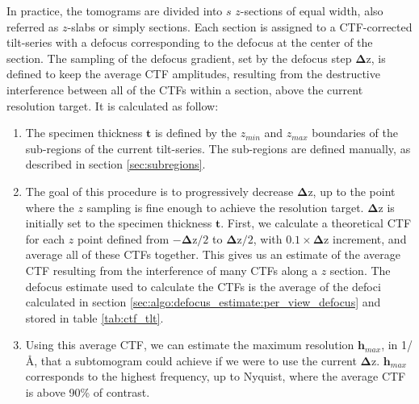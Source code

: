 In practice, the tomograms are divided into $s$ $z$-sections of equal width, also referred as $z$-slabs or simply sections. Each section is assigned to a CTF-corrected tilt-series with a defocus corresponding to the defocus at the center of the section. The sampling of the defocus gradient, set by the defocus step $\bm{\Delta \mathrm{z}}$, is defined to keep the average CTF amplitudes, resulting from the destructive interference between all of the CTFs within a section, above the current resolution target. It is calculated as follow:
\begin{enumerate}
    \item The specimen thickness $\bm{t}$ is defined by the $z_{min}$ and $z_{max}$ boundaries of the sub-regions of the current tilt-series. The sub-regions are defined manually, as described in section \ref{sec:subregions}.
    
    \item The goal of this procedure is to progressively decrease $\bm{\Delta \mathrm{z}}$, up to the point where the $z$ sampling is fine enough to achieve the resolution target. $\bm{\Delta \mathrm{z}}$ is initially set to the specimen thickness $\bm{t}$. First, we calculate a theoretical CTF for each $z$ point defined from $-{\bm{\Delta \mathrm{z}}}/2$ to ${\bm{\Delta \mathrm{z}}}/2$, with $0.1 \times \bm{\Delta \mathrm{z}}$ increment, and average all of these CTFs together. This gives us an estimate of the average CTF resulting from the interference of many CTFs along a $z$ section. The defocus estimate used to calculate the CTFs is the average of the defoci calculated in section \ref{sec:algo:defocus_estimate:per_view_defocus} and stored in table \ref{tab:ctf_tlt}.

    \item Using this average CTF, we can estimate the maximum resolution $\bm{h}_{max}$, in 1/\r{A}, that a subtomogram could achieve if we were to use the current $\bm{\Delta \mathrm{z}}$. $\bm{h}_{max}$ corresponds to the highest frequency, up to Nyquist, where the average CTF is above 90\% of contrast.


\end{enumerate}
